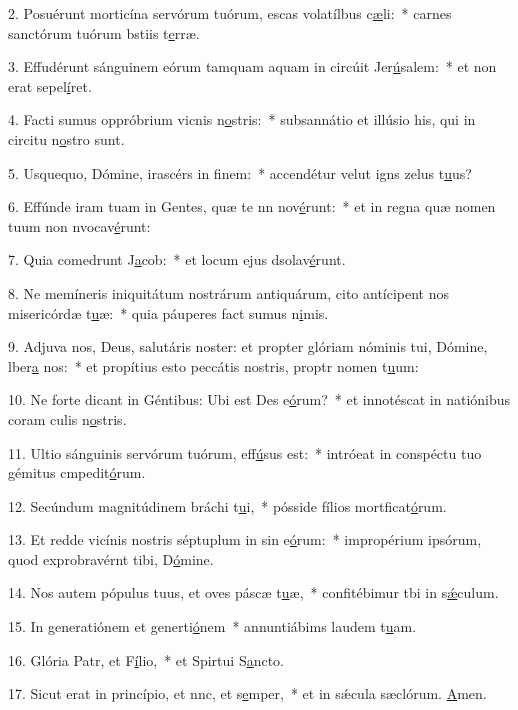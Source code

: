 2. Posuérunt morticína servórum tuórum, escas volatílbus c\uline{æ}li:~* carnes sanctórum tuórum bstiis t\uline{e}rræ.\par 
3. Effudérunt sánguinem eórum tamquam aquam in circúit Jer\uline{ú}salem:~* et non erat  sepel\uline{í}ret.\par 
4. Facti sumus oppróbrium vicnis n\uline{o}stris:~* subsannátio et illúsio his, qui in circitu n\uline{o}stro sunt.\par 
5. Usquequo, Dómine, irascérs in f\uline{i}nem:~* accendétur velut igns zelus t\uline{u}us?\par 
6. Effúnde iram tuam in Gentes, quæ te nn nov\uline{é}runt:~* et in regna quæ nomen tuum non nvocav\uline{é}runt:\par 
7. Quia comedrunt J\uline{a}cob:~* et locum ejus dsolav\uline{é}runt.\par 
8. Ne memíneris iniquitátum nostrárum antiquárum, cito antícipent nos misericórdæ t\uline{u}æ:~* quia páuperes fact sumus n\uline{i}mis.\par 
9. Adjuva nos, Deus, salutáris noster: et propter glóriam nóminis tui, Dómine, lber\uline{a} nos:~* et propítius esto peccátis nostris, proptr nomen t\uline{u}um:\par 
10. Ne forte dicant in Géntibus: Ubi est Des e\uline{ó}rum?~* et innotéscat in natiónibus coram culis n\uline{o}stris.\par 
11. Ultio sánguinis servórum tuórum,  eff\uline{ú}sus est:~* intróeat in conspéctu tuo gémitus cmpedit\uline{ó}rum.\par 
12. Secúndum magnitúdinem bráchi t\uline{u}i,~* pósside fílios mortficat\uline{ó}rum.\par 
13. Et redde vicínis nostris séptuplum in sin e\uline{ó}rum:~* impropérium ipsórum, quod exprobravérnt tibi, D\uline{ó}mine.\par 
14. Nos autem pópulus tuus, et oves páscæ t\uline{u}æ,~* confitébimur tbi in s\uline{ǽ}culum.\par 
15. In generatiónem et generti\uline{ó}nem~* annuntiábims laudem t\uline{u}am.\par 
16. Glória Patr, et F\uline{í}lio,~* et Spirtui S\uline{a}ncto.\par 
17. Sicut erat in princípio, et nnc, et s\uline{e}mper,~* et in sǽcula sæclórum. \uline{A}men.\par 
